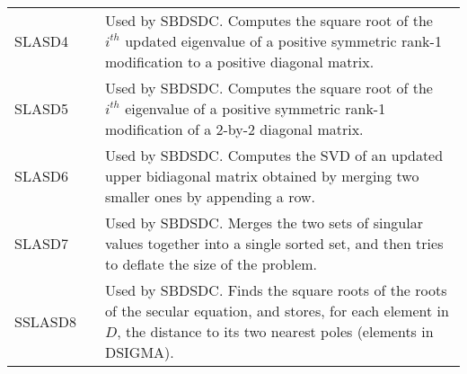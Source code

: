 \begin{center}
\begin{tabular}{| l   p{0.75in} |p{4.5in}    |}
SLASD4&&
Used by SBDSDC.  Computes the square root of the $i^{th}$ updated
eigenvalue of a positive symmetric rank-1 modification to
a positive diagonal matrix. \\
SLASD5&&
Used by SBDSDC.  Computes the square root of the $i^{th}$ eigenvalue
of a positive symmetric rank-1 modification of a 2-by-2 diagonal matrix.\\
SLASD6&&
Used by SBDSDC.  Computes the SVD of an updated upper bidiagonal matrix
obtained by merging two smaller ones by appending a row. \\
SLASD7&&
Used by SBDSDC.  Merges the two sets of singular values together into a
single sorted set, and then tries to deflate the size of the problem.\\
SSLASD8&&
Used by SBDSDC.  Finds the square roots of the roots of the secular
equation, and stores, for each element in $D$, the distance to its two
nearest poles (elements in DSIGMA). \\
\hline
\end{tabular}
\end{center}


